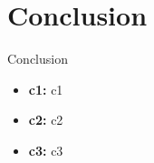 \documentclass{beamer}
\begin{document}
\section{Conclusion}
\begin{frame}{Conclusion}
  \begin{itemize}
    \item \textbf{c1:} c1
    \item \textbf{c2:} c2
    \item \textbf{c3:} c3
  \end{itemize}
\end{frame}
\end{document}
